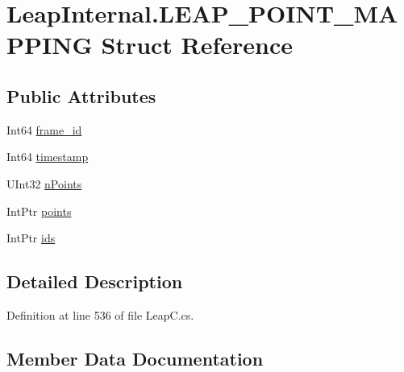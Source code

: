 \hypertarget{struct_leap_internal_1_1_l_e_a_p___p_o_i_n_t___m_a_p_p_i_n_g}{}\section{Leap\+Internal.\+L\+E\+A\+P\+\_\+\+P\+O\+I\+N\+T\+\_\+\+M\+A\+P\+P\+I\+NG Struct Reference}
\label{struct_leap_internal_1_1_l_e_a_p___p_o_i_n_t___m_a_p_p_i_n_g}
\subsection*{Public Attributes}
\begin{DoxyCompactItemize}
\item 
Int64 \mbox{\hyperlink{struct_leap_internal_1_1_l_e_a_p___p_o_i_n_t___m_a_p_p_i_n_g_a9479ff7f8cc3e76a7247a01b9870c93c}{frame\+\_\+id}}
\item 
Int64 \mbox{\hyperlink{struct_leap_internal_1_1_l_e_a_p___p_o_i_n_t___m_a_p_p_i_n_g_acb64d96f8427a3ed35a9996af2b53860}{timestamp}}
\item 
U\+Int32 \mbox{\hyperlink{struct_leap_internal_1_1_l_e_a_p___p_o_i_n_t___m_a_p_p_i_n_g_af98fd422b5a03bbce6185c9cac581e53}{n\+Points}}
\item 
Int\+Ptr \mbox{\hyperlink{struct_leap_internal_1_1_l_e_a_p___p_o_i_n_t___m_a_p_p_i_n_g_a63f672cdf52d4b6cf3397d35de9108bc}{points}}
\item 
Int\+Ptr \mbox{\hyperlink{struct_leap_internal_1_1_l_e_a_p___p_o_i_n_t___m_a_p_p_i_n_g_a23b8b24856dc7e2d9ed16e5ae310cb40}{ids}}
\end{DoxyCompactItemize}


\subsection{Detailed Description}


Definition at line 536 of file Leap\+C.\+cs.



\subsection{Member Data Documentation}
\mbox{\label{struct_leap_internal_1_1_l_e_a_p___p_o_i_n_t___m_a_p_p_i_n_g_a9479ff7f8cc3e76a7247a01b9870c93c}} 
